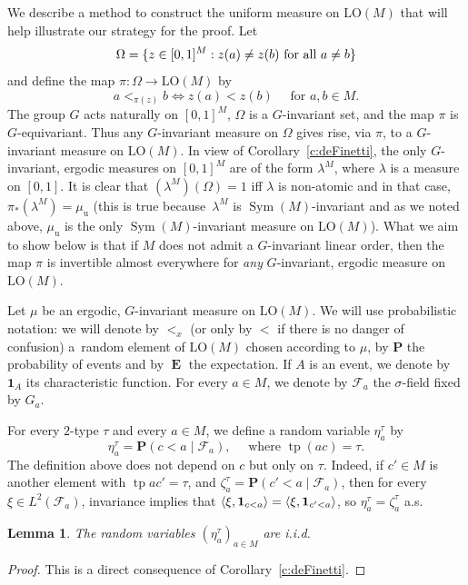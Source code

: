 \documentclass[11pt]{article}
\let\mathcal\mathscr
\theoremstyle{plain}
\newtheorem{lemma}[theorem]{Lemma}
\theoremstyle{definition}
\newcommand{\bP}{{\mathbf P}}\let\Pr\bP
\newcommand{\bOne}{{\mathbf 1}}
\newcommand{\cF}{\mathcal{F}}
\DeclareMathOperator{\E}{\mathbf{E}}
\DeclareMathOperator{\Sym}{Sym}
\DeclareMathOperator{\tp}{tp}
\DeclarePairedDelimiter\ip{\langle}{\rangle}
\DeclarePairedDelimiter\set{\{}{\}}
\newcommand{\LO}{\mathrm{LO}}
\newcommand{\muu}{\mu_{\mathrm{u}}}
\begin{document}
We describe a method to construct the uniform measure on $\LO(M)$ that will help illustrate our strategy for the proof. Let
\begin{equation*}
\Omega = \set{z \in [0, 1]^M : z(a) \neq z(b) \text{ for all } a \neq b}
\end{equation*}
and define the map $\pi \colon \Omega \to \LO(M)$ by
\begin{equation}
\label{eq:def-pi}
a <_{\pi(z)} b \iff z(a) < z(b) \quad \text{ for } a, b \in M.
\end{equation}
The group $G$ acts naturally on $[0, 1]^M$, $\Omega$ is a $G$-invariant set, and the map $\pi$ is $G$\nobreakdash-equivariant. Thus any $G$-invariant measure on $\Omega$ gives rise, via $\pi$, to a $G$-invariant measure on $\LO(M)$. In view of Corollary~\ref{c:deFinetti}, the only $G$-invariant, ergodic measures on $[0, 1]^M$ are of the form $\lambda^M$, where $\lambda$ is a measure on $[0, 1]$. It is clear that \hbox{$(\lambda^M)(\Omega) = 1$} iff $\lambda$ is non-atomic and in that case, $\pi_*(\lambda^M) = \muu$ (this is true because~$\lambda^M$ is $\Sym(M)$-invariant and as we noted above, $\muu$ is the only $\Sym(M)$-invariant measure on $\LO(M)$). What we aim to show below is that if $M$ does not admit a $G$-invariant linear order, then the map $\pi$ is invertible almost everywhere for \emph{any} $G$-invariant, ergodic measure on $\LO(M)$.

Let $\mu$ be an ergodic, $G$-invariant measure on $\LO(M)$. We will use probabilistic notation: we will denote by $<_x$ (or only by $<$ if there is no danger of confusion) a~random element of $\LO(M)$ chosen according to $\mu$, by $\bP$ the probability of events and by $\E$ the expectation. If $A$ is an event, we denote by $\bOne_A$ its characteristic function. For every $a \in M$, we denote by $\cF_a$ the $\sigma$-field fixed by $G_a$.

For every $2$-type $\tau$ and every $a \in M$, we define a random variable $\eta^\tau_a$ by
\begin{equation*}
\eta^\tau_a = \Pr(c < a \mid \cF_a), \quad \text{ where } \tp(ac) = \tau.
\end{equation*}
The definition above does not depend on $c$ but only on $\tau$. Indeed, if $c' \in M$ is another element with $\tp ac' = \tau$, and $\zeta_a^{\tau} = \Pr(c' < a \mid \cF_a)$, then for every $\xi \in L^2(\cF_a)$, invariance implies that $\ip{\xi, \bOne_{c < a}} = \ip{\xi, \bOne_{c' < a}}$, so $\eta_a^\tau = \zeta_a^\tau$ a.s.

\pagebreak[2]
\begin{lemma}
\label{Lem:i.i.d.}
The random variables $(\eta^\tau_a)_{a\in M}$ are i.i.d.
\end{lemma}
\begin{proof}
This is a direct consequence of Corollary~\ref{c:deFinetti}.
\end{proof}
\end{document}
